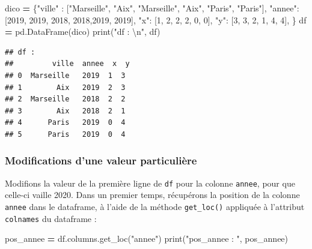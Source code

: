 \documentclass[12pt,]{book}
\newenvironment{Shaded}{\begin{snugshade}}{\end{snugshade}}
\newcommand{\DecValTok}[1]{\textcolor[rgb]{0.00,0.00,0.81}{#1}}
\newcommand{\CharTok}[1]{\textcolor[rgb]{0.31,0.60,0.02}{#1}}
\newcommand{\StringTok}[1]{\textcolor[rgb]{0.31,0.60,0.02}{#1}}
\newcommand{\OperatorTok}[1]{\textcolor[rgb]{0.81,0.36,0.00}{\textbf{#1}}}
\newcommand{\BuiltInTok}[1]{#1}
\newcommand{\NormalTok}[1]{#1}
\numberwithin{equation}{section}
\numberwithin{countremarque}{section}
\begin{document}
\begin{Shaded}
\begin{Highlighting}[]
\NormalTok{dico }\OperatorTok{=}\NormalTok{ \{}\StringTok{"ville"}\NormalTok{ : [}\StringTok{"Marseille"}\NormalTok{, }\StringTok{"Aix"}\NormalTok{,}
                   \StringTok{"Marseille"}\NormalTok{, }\StringTok{"Aix"}\NormalTok{, }\StringTok{"Paris"}\NormalTok{, }\StringTok{"Paris"}\NormalTok{],}
        \StringTok{"annee"}\NormalTok{: [}\DecValTok{2019}\NormalTok{, }\DecValTok{2019}\NormalTok{, }\DecValTok{2018}\NormalTok{, }\DecValTok{2018}\NormalTok{,}\DecValTok{2019}\NormalTok{, }\DecValTok{2019}\NormalTok{],}
        \StringTok{"x"}\NormalTok{: [}\DecValTok{1}\NormalTok{, }\DecValTok{2}\NormalTok{, }\DecValTok{2}\NormalTok{, }\DecValTok{2}\NormalTok{, }\DecValTok{0}\NormalTok{, }\DecValTok{0}\NormalTok{],}
        \StringTok{"y"}\NormalTok{: [}\DecValTok{3}\NormalTok{, }\DecValTok{3}\NormalTok{, }\DecValTok{2}\NormalTok{, }\DecValTok{1}\NormalTok{, }\DecValTok{4}\NormalTok{, }\DecValTok{4}\NormalTok{],}
\NormalTok{       \} }
\NormalTok{df }\OperatorTok{=}\NormalTok{ pd.DataFrame(dico)}
\BuiltInTok{print}\NormalTok{(}\StringTok{"df : }\CharTok{\textbackslash{}n}\StringTok{"}\NormalTok{, df)}
\end{Highlighting}
\end{Shaded}

\begin{lstlisting}
## df : 
##         ville  annee  x  y
## 0  Marseille   2019  1  3
## 1        Aix   2019  2  3
## 2  Marseille   2018  2  2
## 3        Aix   2018  2  1
## 4      Paris   2019  0  4
## 5      Paris   2019  0  4
\end{lstlisting}

\subsubsection{Modifications d'une valeur
particulière}\label{modifications-dune-valeur-particuliere}

Modifions la valeur de la première ligne de \texttt{df} pour la colonne
\texttt{annee}, pour que celle-ci vaille 2020. Dans un premier temps,
récupérons la position de la colonne \texttt{annee} dans le dataframe, à
l'aide de la méthode \texttt{get\_loc()} appliquée à l'attribut
\texttt{colnames} du dataframe :

\begin{Shaded}
\begin{Highlighting}[]
\NormalTok{pos_annee }\OperatorTok{=}\NormalTok{ df.columns.get_loc(}\StringTok{"annee"}\NormalTok{)}
\BuiltInTok{print}\NormalTok{(}\StringTok{"pos_annee : "}\NormalTok{, pos_annee)}
\end{Highlighting}
\end{Shaded}
\end{document}
